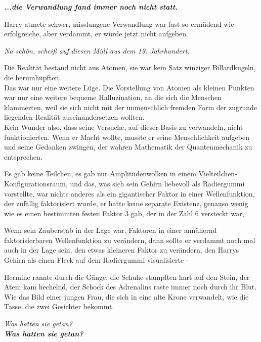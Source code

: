 {\textbf{\emph{...die Verwandlung fand immer noch nicht statt.}}

Harry atmete schwer, misslungene Verwandlung war fast so ermüdend wie erfolgreiche, aber verdammt, er würde jetzt nicht aufgeben.

\emph{Na schön, scheiß auf diesen Müll aus dem 19. Jahrhundert.}

Die Realität bestand nicht aus Atomen, sie war kein Satz winziger Billardkugeln, die herumhüpften.\\ Das war nur eine weitere Lüge. Die Vorstellung von Atomen als kleinen Punkten war nur eine weitere bequeme Halluzination, an die sich die Menschen klammerten, weil sie sich nicht mit der unmenschlich fremden Form der zugrunde liegenden Realität auseinandersetzen wollten.\\ Kein Wunder also, dass seine Versuche, auf dieser Basis zu verwandeln, nicht funktionierten. Wenn er Macht wollte, musste er seine Menschlichkeit aufgeben und seine Gedanken zwingen, der wahren Mathematik der Quantenmechanik zu entsprechen.

Es gab keine Teilchen, es gab nur Amplitudenwolken in einem Vielteilchen-Konfigurationsraum, und das, was sich sein Gehirn liebevoll als Radiergummi vorstellte, war nichts anderes als ein gigantischer Faktor in einer Wellenfunktion, der zufällig faktorisiert wurde, er hatte keine separate Existenz, genauso wenig wie es einen bestimmten festen Faktor 3 gab, der in der Zahl 6 versteckt war,

Wenn sein Zauberstab in der Lage war, Faktoren in einer annähernd faktorisierbaren Wellenfunktion zu verändern, dann sollte er verdammt noch mal auch in der Lage sein, den etwas kleineren Faktor zu verändern, den Harrys Gehirn als einen Fleck auf dem Radiergummi visualisierte -

Hermine rannte durch die Gänge, die Schuhe stampften hart auf den Stein, der Atem kam hechelnd, der Schock des Adrenalins raste immer noch durch ihr Blut. Wie das Bild einer jungen Frau, die sich in eine alte Krone verwandelt, wie die Tasse, die zwei Gesichter bekommt.

\emph{Was hatten sie getan?}\\ \textbf{\emph{Was hatten sie getan?}}

}
